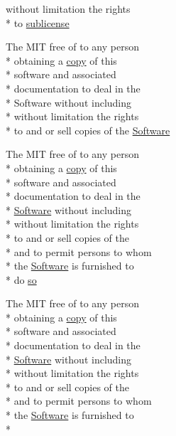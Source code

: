 \begin{DoxyCompactItemize}
without limitation the rights \\*
to \hyperlink{LICENSE_8txt_af9fad5470a0b4e968d19b11b7c643fdb}{sublicense}
\item 
The M\-I\-T free of to any person \\*
obtaining a \hyperlink{LICENSE_8txt_aff1d4c6b756ebf691fa44a0904f68658}{copy} of this \\*
software and associated \\*
documentation to deal in the \\*
Software without including \\*
without limitation the rights \\*
to and or sell copies of the \hyperlink{LICENSE_8txt_a22a1529885b3e9d66b0c72fe604fc3dc}{Software}
\item 
The M\-I\-T free of to any person \\*
obtaining a \hyperlink{LICENSE_8txt_aff1d4c6b756ebf691fa44a0904f68658}{copy} of this \\*
software and associated \\*
documentation to deal in the \\*
\hyperlink{LICENSE_8txt_a22a1529885b3e9d66b0c72fe604fc3dc}{Software} without including \\*
without limitation the rights \\*
to and or sell copies of the \\*
and to permit persons to whom \\*
the \hyperlink{LICENSE_8txt_a22a1529885b3e9d66b0c72fe604fc3dc}{Software} is furnished to \\*
do \hyperlink{LICENSE_8txt_ab05c0f0392781fce452b91e1ede41d90}{so}
\item 
The M\-I\-T free of to any person \\*
obtaining a \hyperlink{LICENSE_8txt_aff1d4c6b756ebf691fa44a0904f68658}{copy} of this \\*
software and associated \\*
documentation to deal in the \\*
\hyperlink{LICENSE_8txt_a22a1529885b3e9d66b0c72fe604fc3dc}{Software} without including \\*
without limitation the rights \\*
to and or sell copies of the \\*
and to permit persons to whom \\*
the \hyperlink{LICENSE_8txt_a22a1529885b3e9d66b0c72fe604fc3dc}{Software} is furnished to \\*

\end{DoxyCompactItemize}
